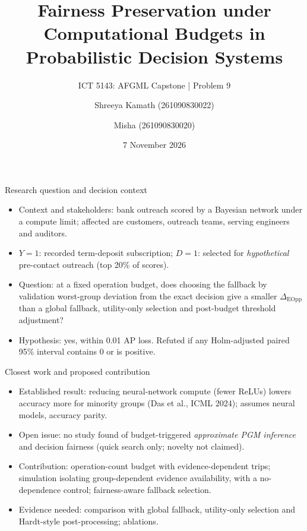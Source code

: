 \documentclass[aspectratio=169,11pt]{beamer}
\title[AFGML Capstone]{Fairness Preservation under Computational Budgets in Probabilistic Decision Systems}
\subtitle{ICT 5143: AFGML Capstone | Problem 9}
\author{Shreeya Kamath (261090830022) \and Misha (261090830020)}
\date{7 November 2026}
\begin{document}
\begin{frame}\titlepage\end{frame}

\begin{frame}{Research question and decision context}
\begin{itemize}
\item Context and stakeholders: bank outreach scored by a Bayesian network under a compute limit; affected are customers, outreach teams, serving engineers and auditors.
\item $Y=1$: recorded term-deposit subscription; $D=1$: selected for \emph{hypothetical} pre-contact outreach (top 20\% of scores).
\item Question: at a fixed operation budget, does choosing the fallback by validation worst-group deviation from the exact decision give a smaller $\Delta_{\mathrm{EOpp}}$ than a global fallback, utility-only selection and post-budget threshold adjustment?
\item Hypothesis: yes, within 0.01 AP loss. Refuted if any Holm-adjusted paired 95\% interval contains $0$ or is positive.
\end{itemize}
\end{frame}

\begin{frame}{Closest work and proposed contribution}
\begin{itemize}
\item Established result: reducing neural-network compute (fewer ReLUs) lowers accuracy more for minority groups (Das et al., ICML 2024); assumes neural models, accuracy parity.
\item Open issue: no study found of budget-triggered \emph{approximate PGM inference} and decision fairness (quick search only; novelty not claimed).
\item Contribution: operation-count budget with evidence-dependent trips; simulation isolating group-dependent evidence availability, with a no-dependence control; fairness-aware fallback selection.
\item Evidence needed: comparison with global fallback, utility-only selection and Hardt-style post-processing; ablations.
\end{itemize}
\end{frame}
\end{document}
